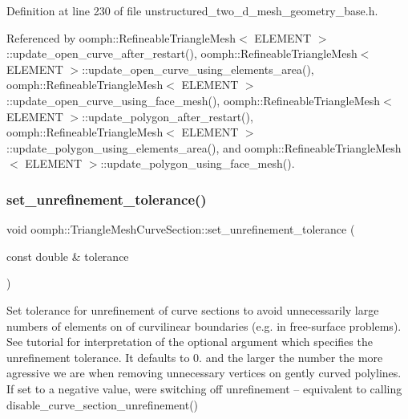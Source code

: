 Definition at line 230 of file unstructured\+\_\+two\+\_\+d\+\_\+mesh\+\_\+geometry\+\_\+base.\+h.



Referenced by oomph\+::\+Refineable\+Triangle\+Mesh$<$ E\+L\+E\+M\+E\+N\+T $>$\+::update\+\_\+open\+\_\+curve\+\_\+after\+\_\+restart(), oomph\+::\+Refineable\+Triangle\+Mesh$<$ E\+L\+E\+M\+E\+N\+T $>$\+::update\+\_\+open\+\_\+curve\+\_\+using\+\_\+elements\+\_\+area(), oomph\+::\+Refineable\+Triangle\+Mesh$<$ E\+L\+E\+M\+E\+N\+T $>$\+::update\+\_\+open\+\_\+curve\+\_\+using\+\_\+face\+\_\+mesh(), oomph\+::\+Refineable\+Triangle\+Mesh$<$ E\+L\+E\+M\+E\+N\+T $>$\+::update\+\_\+polygon\+\_\+after\+\_\+restart(), oomph\+::\+Refineable\+Triangle\+Mesh$<$ E\+L\+E\+M\+E\+N\+T $>$\+::update\+\_\+polygon\+\_\+using\+\_\+elements\+\_\+area(), and oomph\+::\+Refineable\+Triangle\+Mesh$<$ E\+L\+E\+M\+E\+N\+T $>$\+::update\+\_\+polygon\+\_\+using\+\_\+face\+\_\+mesh().

\mbox{\label{classoomph_1_1TriangleMeshCurveSection_a2e586bbd0adf5f5f9b5cb4ed4300614a}} 
\subsubsection{\texorpdfstring{set\+\_\+unrefinement\+\_\+tolerance()}{set\_unrefinement\_tolerance()}}
{\footnotesize\ttfamily void oomph\+::\+Triangle\+Mesh\+Curve\+Section\+::set\+\_\+unrefinement\+\_\+tolerance (\begin{DoxyParamCaption}\item[{const double \&}]{tolerance }\end{DoxyParamCaption})\hspace{0.3cm}{\ttfamily [inline]}}



Set tolerance for unrefinement of curve sections to avoid unnecessarily large numbers of elements on of curvilinear boundaries (e.\+g. in free-\/surface problems). See tutorial for interpretation of the optional argument which specifies the unrefinement tolerance. It defaults to 0. and the larger the number the more agressive we are when removing unnecessary vertices on gently curved polylines. If set to a negative value, we\textquotesingle{}re switching off unrefinement -- equivalent to calling disable\+\_\+curve\+\_\+section\+\_\+unrefinement() 



